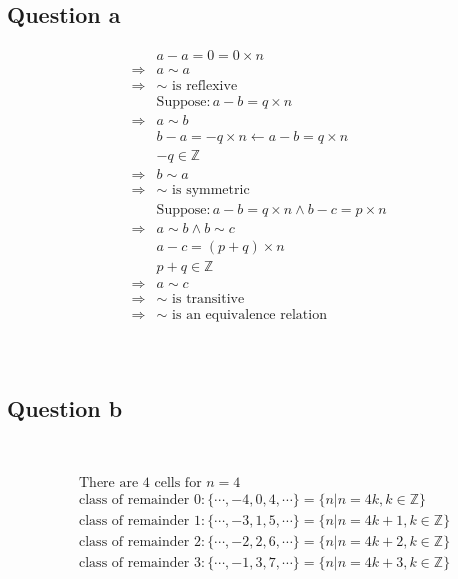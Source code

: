 \documentclass{article}
\begin{document}
\subsection*{Question a}
\begin{equation*}
    \begin{split}
        &a-a=0=0\times n\\
        \Rightarrow&a\sim a\\
        \Rightarrow&\sim\text{ is reflexive}\\
        &\text{Suppose}:a-b=q\times n\\
        \Rightarrow&a\sim b\\
        &b-a=-q\times n\leftarrow a-b=q\times n\\
        &-q\in\mathbb{Z} \\
        \Rightarrow&b\sim a\\
        \Rightarrow&\sim\text{ is symmetric}\\
        &\text{Suppose}:a-b=q\times n\land b-c=p\times n\\
        \Rightarrow&a\sim b\land b\sim c\\
        &a-c=(p+q)\times n\\
        &p+q\in\mathbb{Z} \\
        \Rightarrow&a\sim c\\
        \Rightarrow&\sim\text{ is transitive}\\
        \Rightarrow&\sim\text{ is an equivalence relation}\\
    \end{split}
\end{equation*}

~

\subsection*{Question b}

~

\begin{equation*}
    \begin{split}
        &\text{There are 4 cells for }n=4\\
        &\text{class of remainder }0:\{\cdots ,-4,0,4,\cdots\}=\{n|n=4k,k\in\mathbb{Z} \}\\
        &\text{class of remainder }1:\{\cdots ,-3,1,5,\cdots\}=\{n|n=4k+1,k\in\mathbb{Z} \}\\
        &\text{class of remainder }2:\{\cdots ,-2,2,6,\cdots\}=\{n|n=4k+2,k\in\mathbb{Z} \}\\
        &\text{class of remainder }3:\{\cdots ,-1,3,7,\cdots\}=\{n|n=4k+3,k\in\mathbb{Z} \}\\
    \end{split}
\end{equation*}
\end{document}
